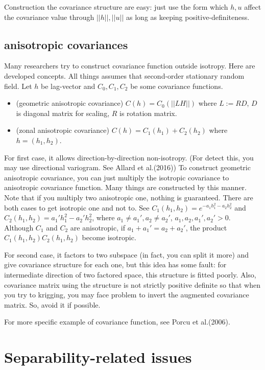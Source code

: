 \documentclass{article}
\begin{document}
Construction the covariance structure are easy: just use the form which $h,u$ affect the covariance value through $||h||, ||u||$
as long as keeping positive-definiteness.


\subsection{anisotropic covariances}
Many researchers try to construct covariance function outside isotropy. Here are developed concepts.
All things assumes that second-order stationary random field. Let $h$ be lag-vector and $C_0,C_1,C_2$ be some covariance functions.
\begin{itemize}
    \item (geometric anisotropic covariance) $C(h)=C_0(||LH||)$ where $L:=RD$, $D$ is diagonal matrix for scaling, $R$ is rotation matrix.
    \item (zonal anisotropic covariance) $C(h)=C_1(h_1)+C_2(h_2)$ where $h=(h_1,h_2)$.
\end{itemize}
For first case, it allows direction-by-direction non-isotropy. (For detect this, you may use directional variogram. See Allard et al.(2016))
To construct geometric anisotropic covariance, you can just multiply the isotropic covariance to anisotropic covariance function.
Many things are constructed by this manner. Note that if you multiply two anisotropic one, nothing is guaranteed. There are both cases to get isotropic one and not to.
See $C_1(h_1,h_2)=e^{-a_1 h_1^2-a_2 h_2^2}$ and $C_2(h_1,h_2)=a_1' h_1^2-a_2' h_2^2$, where $a_1\neq a_1', a_2 \neq a_2'$, $a_1,a_2,a_1',a_2'>0$.
Although $C_1$ and $C_2$ are anisotropic, if $a_1+a_1'=a_2+a_2'$, the product $C_1(h_1,h_2)C_2(h_1,h_2)$ become isotropic.

For second case, it factors to two subspace (in fact, you can split it more) and give covariance structure for each one,
but this idea has some fault: for intermediate direction of two factored space, this structure is fitted poorly.
Also, covariance matrix using the structure is not strictly positive definite so that when you try to krigging,
you may face problem to invert the augmented covariance matrix. So, avoid it if possible.

For more specific example of covariance function, see Porcu et al.(2006).


\section{Separability-related issues}
\end{document}
